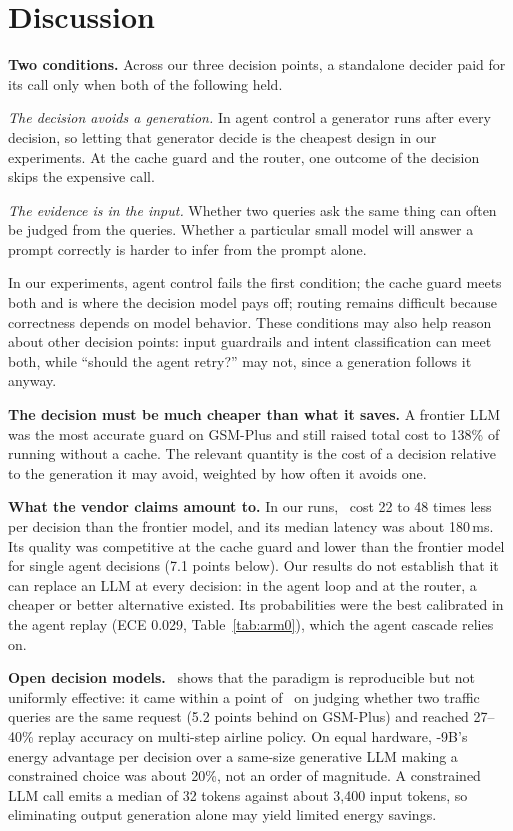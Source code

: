 \section{Discussion}
\label{sec:discussion}

\textbf{Two conditions.}
Across our three decision points, a standalone decider paid for its call only when both of the following held.

\emph{The decision avoids a generation.}
In agent control a generator runs after every decision, so letting that generator decide is the cheapest design in our experiments.
At the cache guard and the router, one outcome of the decision skips the expensive call.

\emph{The evidence is in the input.}
Whether two queries ask the same thing can often be judged from the queries.
Whether a particular small model will answer a prompt correctly is harder to infer from the prompt alone.

In our experiments, agent control fails the first condition; the cache guard meets both and is where the decision model pays off; routing remains difficult because correctness depends on model behavior. These conditions may also help reason about other decision points: input guardrails and intent classification can meet both, while ``should the agent retry?'' may not, since a generation follows it anyway.

\textbf{The decision must be much cheaper than what it saves.}
A frontier LLM was the most accurate guard on GSM-Plus and still raised total cost to 138\% of running without a cache.
The relevant quantity is the cost of a decision relative to the generation it may avoid, weighted by how often it avoids one.

\textbf{What the vendor claims amount to.}
In our runs, \jev\ cost 22 to 48 times less per decision than the frontier model, and its median latency was about 180\,ms.
Its quality was competitive at the cache guard and lower than the frontier model for single agent decisions (7.1 points below).
Our results do not establish that it can replace an LLM at every decision: in the agent loop and at the router, a cheaper or better alternative existed.
Its probabilities were the best calibrated in the agent replay (ECE 0.029, Table~\ref{tab:arm0}), which the agent cascade relies on.

\textbf{Open decision models.}
\kev\ shows that the paradigm is reproducible but not uniformly effective: it came within a point of \jev\ on judging whether two traffic queries are the same request (5.2 points behind on GSM-Plus) and reached 27--40\% replay accuracy on multi-step airline policy.
On equal hardware, \kev-9B's energy advantage per decision over a same-size generative LLM making a constrained choice was about 20\%, not an order of magnitude.
A constrained LLM call emits a median of 32 tokens against about 3,400 input tokens, so eliminating output generation alone may yield limited energy savings.

